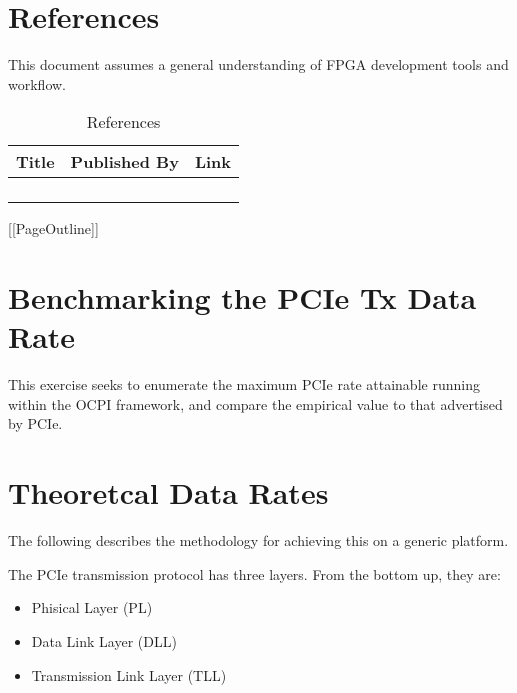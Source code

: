 \newpage

\tableofcontents

\newpage

\listoffigures

\newpage

\listoftables

\newpage

\section{References}
\label{sec:references}
This document assumes a general understanding of FPGA development tools and workflow.  
	\begin{center} 
		\begin{table}[H]	
		\caption {References}
		\label{table:references}
			\begin{tabularx}{\textwidth}{|c|c|X|}	
			\hline
			\rowcolor{blue}
			\textbf{Title} & \textbf{Published By} & \textbf{Link} \\ 
			\hline 
			 & & \url{} \\ 
			\hline 
			&  & \url{} \\ 
			\hline 
			 &  & \url{} \\ 
			\hline 
			\\ 					
			\hline 
			\end{tabularx} 
		\end{table} 		
	\end{center}

\newpage

[[PageOutline]]
\section{Benchmarking the PCIe Tx Data Rate}

This exercise seeks to enumerate the maximum PCIe rate attainable running within the OCPI framework, and compare the empirical value to that advertised by PCIe.

\section{Theoretcal Data Rates}

The following describes the methodology for achieving this on a generic platform.

The PCIe transmission protocol has three layers.  From the bottom up, they are:
\begin{itemize}
\item{Phisical Layer (PL)}
\item{Data Link Layer (DLL)} 
\item{Transmission Link Layer (TLL)}
\end{itemize}

